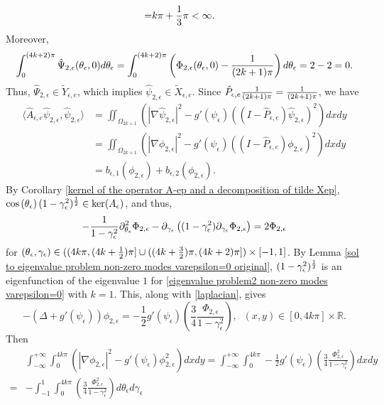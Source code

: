 \documentclass[1 [leqno, 11pt]{amsart}
\numberwithin{equation}{section}
\let\ep=\epsilon
\let\pa=\partial
\def\gep{\gamma_\epsilon}
\begin{document}
\begin{CJK*}{GBK}{song}
\begin{align*}
= &
k\pi+{1\over3}\pi<\infty.
 \end{align*}
 Moreover,
 \begin{align*}
 \int_{0}^{(4k+2)\pi}\hat\Psi_{2,\ep}(\theta_\ep,0)d\theta_\ep=\int_{0}^{(4k+2)\pi}\left(\Phi_{2,\ep}(\theta_\ep,0)-{1\over (2k+1)\pi}\right)d\theta_\ep=2-2
 =0.
 \end{align*}
Thus, $\hat\Psi_{2,\ep}\in\tilde Y_{\ep,e}$, which implies $ \hat{\psi}_{2,\ep}\in \tilde X_{\ep,e}$. Since $\hat{P}_{\ep,e}{1\over (2k+1)\pi}={1\over (2k+1)\pi}$, we have
\begin{align}\nonumber
\langle\hat{A}_{\ep,e} \hat{\psi}_{2,\ep}, \hat{\psi}_{2,\ep}\rangle
&= \iint_{\Omega_{2k+1}} \left( |\nabla \hat{\psi}_{2,\ep}|^2 - g'(\psi_\ep)((I - \hat{P}_{\ep,e})\hat{\psi}_{2,\ep})^2\right) dxdy\\\nonumber
&=\iint_{\Omega_{2k+1}}\left( |\nabla {\phi}_{2,\ep}|^2 - g'(\psi_\ep)((I - \hat{P}_{\ep,e}){\phi}_{2,\ep})^2\right) dxdy\\\label{Aep-psi-2-ep-2}
&=b_{\ep, 1}({\phi}_{2,\ep}) + b_{\ep, 2}({\phi}_{2,\ep}).
\end{align}
 By Corollary  \ref{kernel of  the operator A-ep and a decomposition of tilde Xep},
 $\cos\left(\theta_\ep\right)(1-\gamma_\ep^2)^{1\over2}\in \ker( A_\ep)$,
 and thus,
 \begin{align}\label{hat-psi-4kpi-4k+2pi-2}
-{1\over1-\gamma_\ep^2}\pa_{\theta_\ep}^2\Phi_{2,\ep}-\pa_{\gamma_\ep}\left((1-\gamma_\ep^2)\pa_{\gamma_\ep}\Phi_{2,\ep}\right)
=2\Phi_{2,\ep}
 \end{align}
 for $(\theta_\ep,\gamma_\ep) \in ((4k\pi,(4k+{1\over 2})\pi]\cup((4k+{3\over 2})\pi,(4k+2)\pi])\times[-1,1]$.
  By Lemma
\ref{sol to eigenvalue problem non-zero modes varepsilon=0 original}, $(1-\gamma_\ep^2)^{1\over2}$ is an
 eigenfunction of the eigenvalue $1$ for \eqref{eigenvalue problem2 non-zero modes varepsilon=0} with $k=1$. This, along with \eqref{laplacian}, gives
$$-(\Delta + g'(\psi_\ep)) {\phi}_{2,\ep} = - \frac 1 2 g'(\psi_\ep) \left( \frac 3 4 \frac{{\Phi}_{2,\ep}}{1-\gamma_\ep^2} \right),\;\;(x,y) \in [0, 4k\pi]\times \mathbb{R}.$$
Then
\begin{align}\nonumber
& \int_{-\infty}^{+\infty} \int_0^{4k\pi} \left(|\nabla {\phi}_{2,\ep}|^2 - g'(\psi_\epsilon){\phi}_{2,\ep}^2\right) dx dy  = \int_{-\infty}^{+\infty} \int_0^{4k\pi} - \frac 1 2 g'(\psi_\ep) \left( \frac 3 4 \frac{{\Phi}_{2,\ep}^2}{1-\gamma_\ep^2} \right)dx dy \\\label{b1-odd-term1-2}
= & - \int_{-1}^{1} \int_0^{4k\pi}  \left( \frac 3 4 \frac{{\Phi}_{2,\ep}^2}{1-\gamma_\ep^2} \right)d \theta_\ep d\gep

\end{align}
\end{CJK*}
\end{document}
